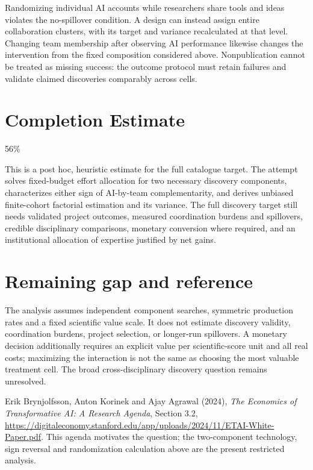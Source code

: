 \documentclass[11pt,a4paper]{article}
\theoremstyle{definition}
\theoremstyle{remark}
\begin{document}
Randomizing individual AI accounts while researchers share tools and ideas violates the no-spillover condition. A design can instead assign entire collaboration clusters, with its target and variance recalculated at that level. Changing team membership after observing AI performance likewise changes the intervention from the fixed composition considered above. Nonpublication cannot be treated as missing success: the outcome protocol must retain failures and validate claimed discoveries comparably across cells.

\section{Completion Estimate}
56\%

This is a post hoc, heuristic estimate for the full catalogue target.
The attempt solves fixed-budget effort allocation for two necessary discovery components, characterizes either sign of AI-by-team complementarity, and derives unbiased finite-cohort factorial estimation and its variance. The full discovery target still needs validated project outcomes, measured coordination burdens and spillovers, credible disciplinary comparisons, monetary conversion where required, and an institutional allocation of expertise justified by net gains.

\section{Remaining gap and reference}
The analysis assumes independent component searches, symmetric production rates and a fixed scientific value scale. It does not estimate discovery validity, coordination burdens, project selection, or longer-run spillovers. A monetary decision additionally requires an explicit value per scientific-score unit and all real costs; maximizing the interaction is not the same as choosing the most valuable treatment cell. The broad cross-disciplinary discovery question remains unresolved.

Erik Brynjolfsson, Anton Korinek and Ajay Agrawal (2024), \emph{The Economics of Transformative AI: A Research Agenda}, Section 3.2, \url{https://digitaleconomy.stanford.edu/app/uploads/2024/11/ETAI-White-Paper.pdf}. This agenda motivates the question; the two-component technology, sign reversal and randomization calculation above are the present restricted analysis.
\end{document}
